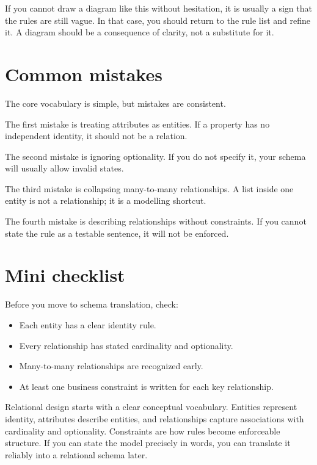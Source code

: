 If you cannot draw a diagram like this without hesitation, it is usually a sign that the rules are still vague.
In that case, you should return to the rule list and refine it.
A diagram should be a consequence of clarity, not a substitute for it.

\section{Common mistakes}
The core vocabulary is simple, but mistakes are consistent.

The first mistake is treating attributes as entities.
If a property has no independent identity, it should not be a relation.

The second mistake is ignoring optionality.
If you do not specify it, your schema will usually allow invalid states.

The third mistake is collapsing many-to-many relationships.
A list inside one entity is not a relationship; it is a modelling shortcut.

The fourth mistake is describing relationships without constraints.
If you cannot state the rule as a testable sentence, it will not be enforced.

\section{Mini checklist}
Before you move to schema translation, check:
\begin{itemize}[leftmargin=*,nosep]
  \item Each entity has a clear identity rule.
  \item Every relationship has stated cardinality and optionality.
  \item Many-to-many relationships are recognized early.
  \item At least one business constraint is written for each key relationship.
\end{itemize}

\begin{chaptersummary}
Relational design starts with a clear conceptual vocabulary.
Entities represent identity, attributes describe entities, and relationships capture associations with cardinality and optionality.
Constraints are how rules become enforceable structure.
If you can state the model precisely in words, you can translate it reliably into a relational schema later.
\end{chaptersummary}

